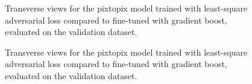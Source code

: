 \begin{figure}[h]
  \centering
  \begin{adjustbox}{width=\linewidth}
  \end{adjustbox}
  \caption{Transverse views for the pixtopix model trained with least-square
    adversarial loss compared to fine-tuned with gradient boost, evaluated on
    the validation dataset.
  }\label{fig:pixtopix:training}
\end{figure}
\begin{figure}[h]
  \centering
  \begin{adjustbox}{width=\linewidth}
  \end{adjustbox}
  \caption{Transverse views for the pixtopix model trained with least-square
    adversarial loss compared to fine-tuned with gradient boost, evaluated on
    the validation dataset.
  }\label{fig:pixtopix:validation}
\end{figure}

